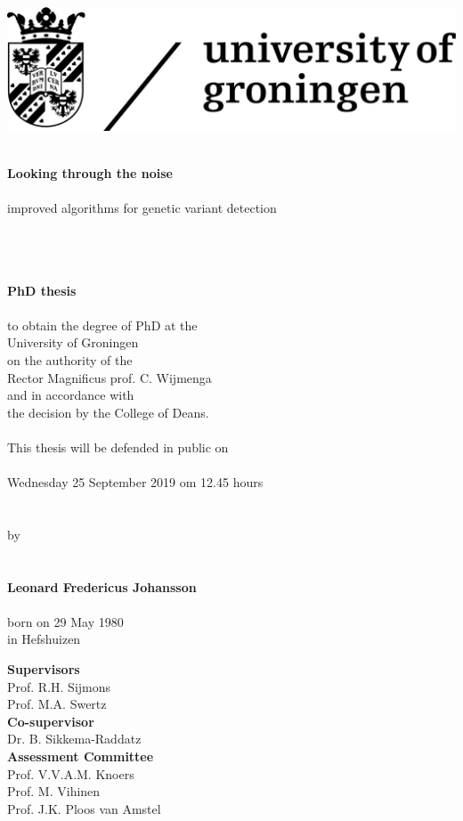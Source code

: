 \begin{flushleft}
	\includegraphics[scale=0.1]{img/rugr_logoen_zwart_rgb}
\end{flushleft}

\begin{center}
	\linespread{1.00} %
	~\\
	\huge
	\textbf{Looking through the noise}
	\\~\\
	\large
	improved algorithms for genetic variant detection
	\\~\\~\\~\\
	\linespread{1.05} %
	
	
	\large
	\textbf{PhD thesis}
	\\~\\
	\normalsize
	to obtain the degree of PhD at the\\
	University of Groningen\\
	on the authority of the\\
	Rector Magnificus prof. C. Wijmenga\\
	and in accordance with \\
	the decision by the College of Deans.
	\\~\\
	This thesis will be defended in public on
	\\~\\
	Wednesday 25 September 2019 om 12.45 hours 
	\\~\\~\\
	by
	\\~\\~\\
	\large
	\textbf{Leonard Fredericus Johansson}
	\\~\\
	\normalsize
	born on 29 May 1980\\
	in Hefshuizen\\
	\normalsize
\end{center}

\clearpage

\noindent
\textbf{Supervisors}\\
Prof. R.H. Sijmons \\
Prof. M.A. Swertz \\

\noindent
\textbf{Co-supervisor}\\
Dr. B. Sikkema-Raddatz \\

\noindent
\textbf{Assessment Committee}\\
Prof. V.V.A.M. Knoers\\
Prof. M. Vihinen\\
Prof. J.K. Ploos van Amstel\\
